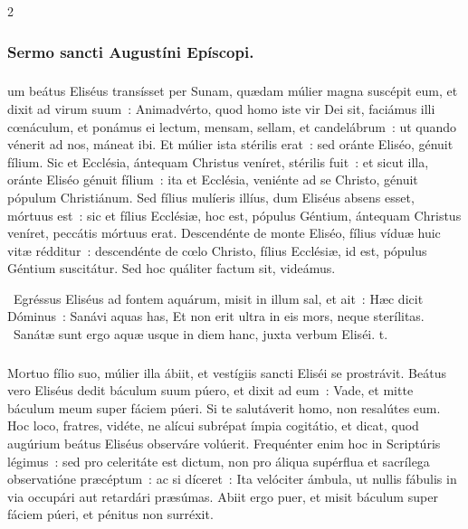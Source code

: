 \documentclass[9pt,twoside]{extarticle}
\begin{document}
\begin{multicols}{2}
{\subsubsection*{\center Sermo sancti Augustíni Epíscopi.}
\subsubsection*{\center {}}
um beátus Eliséus transísset per Sunam, quædam múlier magna suscépit eum, et dixit ad virum suum~: Animadvérto, quod homo iste vir Dei sit, faciámus illi cœnáculum, et ponámus ei lectum, mensam, sellam, et candelábrum~: ut quando vénerit ad nos, máneat ibi. Et múlier ista stérilis erat~: sed oránte Eliséo, génuit fílium. Sic et Ecclésia, ántequam Christus veníret, stérilis fuit~: et sicut illa, oránte Eliséo génuit fílium~: ita et Ecclésia, veniénte ad se Christo, génuit pópulum Christiánum. Sed fílius mulíeris illíus, dum Eliséus absens esset, mórtuus est~: sic et fílius Ecclésiæ, hoc est, pópulus Géntium, ántequam Christus veníret, peccátis mórtuus erat. Descendénte de monte Eliséo, fílius víduæ huic vitæ rédditur~: descendénte de cœlo Christo, fílius Ecclésiæ, id est, pópulus Géntium suscitátur. Sed hoc quáliter factum sit, videámus.

\begin{tightlist}{}
\item {}~Egréssus Eliséus ad fontem aquárum, misit in illum sal, et ait~: Hæc dicit Dóminus~: Sanávi aquas has, \textred{*} Et non erit ultra in eis mors, neque sterílitas. ~Sanátæ sunt ergo aquæ usque in diem hanc, juxta verbum Eliséi. t.
\end{tightlist}

\subsubsection*{\center {}}
\lettrine{M}ortuo fílio suo, múlier illa ábiit, et vestígiis sancti Eliséi se prostrávit. Beátus vero Eliséus dedit báculum suum púero, et dixit ad eum~: Vade, et mitte báculum meum super fáciem púeri. Si te salutáverit homo, non resalútes eum. Hoc loco, fratres, vidéte, ne alícui subrépat ímpia cogitátio, et dicat, quod augúrium beátus Eliséus observáre volúerit. Frequénter enim hoc in Scriptúris légimus~: sed pro celeritáte est dictum, non pro áliqua supérflua et sacrílega observatióne præcéptum~: ac si díceret~: Ita velóciter ámbula, ut nullis fábulis in via occupári aut retardári præsúmas. Abiit ergo puer, et misit báculum super fáciem púeri, et pénitus non surréxit.

}
\end{multicols}
\end{document}
